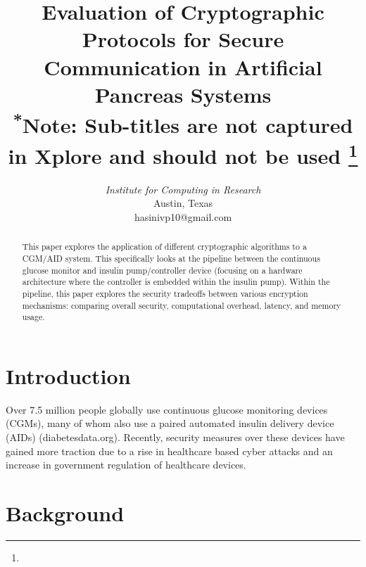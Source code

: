 \documentclass[conference]{IEEEtran}
\begin{document}
\title{Evaluation of Cryptographic Protocols for Secure Communication in Artificial Pancreas Systems\\
{\footnotesize \textsuperscript{*}Note: Sub-titles are not captured in Xplore and
should not be used}
\thanks{}
}

\author{
\textit{Institute for Computing in Research}\\
Austin, Texas \\
hasinivp10@gmail.com}


\maketitle

\begin{abstract}
This paper explores the application of different cryptographic algorithms to a CGM/AID system. This specifically looks at the pipeline between the continuous glucose monitor and insulin pump/controller device (focusing on a hardware architecture where the controller is embedded within the insulin pump). Within the pipeline, this paper explores the security tradeoffs between various encryption mechanisms: comparing overall security, computational overhead, latency, and memory usage.
\end{abstract}


\section{Introduction}
Over 7.5 million people globally use continuous glucose monitoring devices (CGMs), many of whom also use a paired automated insulin delivery device (AIDs) (diabetesdata.org). Recently, security measures over these devices have gained more traction due to a rise in healthcare based cyber attacks and an increase in government regulation of healthcare devices.

\section{Background}
\end{document}
